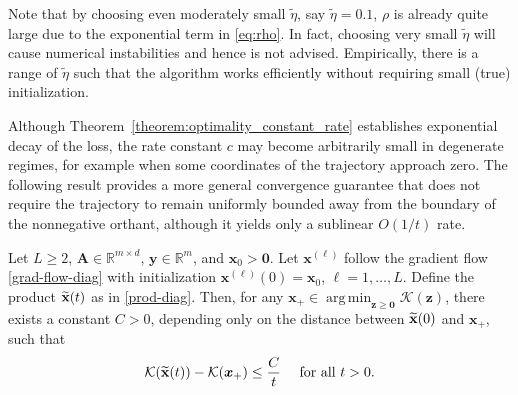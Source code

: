 \documentclass{svproc}
\newcommand{\corr}[1]{#1}
\newcommand{\bA}{\boldsymbol{A}}
\newcommand{\bx}{\boldsymbol{x}}
\newcommand{\by}{\boldsymbol{y}}
\newcommand{\bz}{\boldsymbol{z}}
\newcommand{\0}{\boldsymbol{0}}
\newcommand{\1}{\boldsymbol{1}}
\DeclareMathOperator*{\argmin}{arg\,min}
\renewcommand{\tilde}{\widetilde}
\def\xprod{\tilde{\bf x}}
\def\tcont{{t}}
\def\lrr{{\tilde{\eta}}}
\begin{document}
Note that by choosing even moderately small $\lrr$, say $\lrr=0.1$, $\rho$ is already quite large due to the exponential term in \eqref{eq:rho}.
In fact, choosing very small $\lrr$ will cause numerical instabilities and hence is not advised. Empirically, there \corr{is a range} of $\lrr$ such that the algorithm works efficiently without requiring small (true) initialization.



Although Theorem~\ref{theorem:optimality_constant_rate} establishes exponential decay of the loss, the rate constant $c$ may become arbitrarily small in degenerate regimes, for example when some coordinates of the trajectory approach zero. The following result provides a more general convergence guarantee that does not require the trajectory to remain uniformly bounded away from the boundary of the nonnegative orthant, although it yields only a sublinear $O(1/t)$ rate.

\begin{theorem}\label{thm:non-Accelerated}
Let $L\geq 2$, $\bA\in\mathbb{R}^{m\times d}$, $\by\in\mathbb{R}^{m}$, and $\bx_0>\0$. Let $\bx^{(\ell)}$ follow the gradient flow \eqref{grad-flow-diag} with initialization $\bx^{(\ell)}(0)=\bx_0$, $\ell=1,\hdots,L$. Define the product $\xprod(t)$ as in \eqref{prod-diag}. Then, for any $\bx_+\in\argmin_{\bz\geq\0}\mathcal{K}(\bz)$, there exists a constant $C>0$, depending only on the distance between $\xprod(0)$ and $\bx_+$, such that
\begin{equation*}
\mathcal{K}(\xprod(\tcont))-\mathcal{K}(\bx_+)\leq\frac{C}{\tcont} \quad \mbox{ for all } \tcont > 0.
\end{equation*}
\end{theorem}
\end{document}
